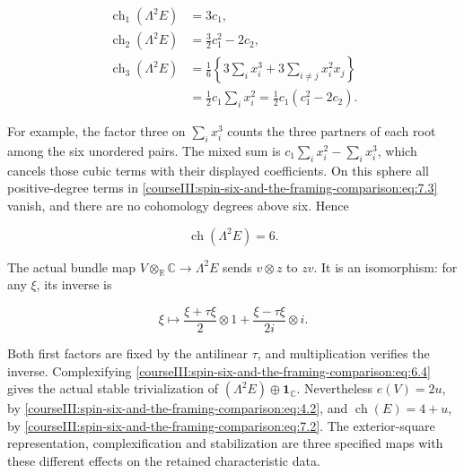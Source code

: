 \begin{equation}
\begin{aligned}
\operatorname{ch}_1(\Lambda^2E)&=3c_1,\\
\operatorname{ch}_2(\Lambda^2E)&=\tfrac32c_1^2-2c_2,\\
\operatorname{ch}_3(\Lambda^2E)
&=\frac16\left\{3\sum_i x_i^3+
3\sum_{i\ne j}x_i^2x_j\right\}\\
&=\tfrac12c_1\sum_i x_i^2
=\tfrac12c_1(c_1^2-2c_2).
\end{aligned}
\label{courseIII:spin-six-and-the-framing-comparison:eq:7.3}
\end{equation}

For example, the factor three on \(\sum_i x_i^3\) counts the three partners of each root among the six unordered pairs. The mixed sum is \(c_1\sum_i x_i^2-\sum_i x_i^3\), which cancels those cubic terms with their displayed coefficients. On this sphere all positive-degree terms in \eqref{courseIII:spin-six-and-the-framing-comparison:eq:7.3} vanish, and there are no cohomology degrees above six. Hence

\begin{equation}
\operatorname{ch}(\Lambda^2E)=6.
\label{courseIII:spin-six-and-the-framing-comparison:eq:7.4}
\end{equation}

The actual bundle map \(V\otimes_{\mathbb R}\mathbb C\to\Lambda^2E\) sends \(v\otimes z\) to \(zv\). It is an isomorphism: for any \(\xi\), its inverse is

\begin{equation}
\xi\longmapsto
\frac{\xi+\tau\xi}{2}\otimes1+
\frac{\xi-\tau\xi}{2i}\otimes i.
\label{courseIII:spin-six-and-the-framing-comparison:eq:7.5}
\end{equation}

Both first factors are fixed by the antilinear \(\tau\), and multiplication verifies the inverse. Complexifying \eqref{courseIII:spin-six-and-the-framing-comparison:eq:6.4} gives the actual stable trivialization of \((\Lambda^2E)\oplus\mathbf1_{\mathbb C}\). Nevertheless \(e(V)=2u\), by \eqref{courseIII:spin-six-and-the-framing-comparison:eq:4.2}, and \(\operatorname{ch}(E)=4+u\), by \eqref{courseIII:spin-six-and-the-framing-comparison:eq:7.2}. The exterior-square representation, complexification and stabilization are three specified maps with these different effects on the retained characteristic data.
